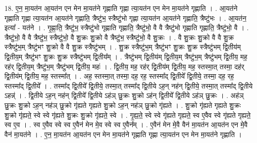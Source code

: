 \documentclass[17pt]{extarticle}
\begin{document}
18. ए॒न॒ मा॒यत॑न आ॒यत॑न एन मेन मा॒यत॑ने गृह्णाति गृह्णा त्या॒यत॑न एन मेन मा॒यत॑ने गृह्णाति । . आ॒यत॑ने गृह्णाति गृह्णा त्या॒यत॑न आ॒यत॑ने गृह्णाति॒ त्रैष्टु॑भ॒ स्त्रैष्टु॑भो गृह्णा त्या॒यत॑न आ॒यत॑ने गृह्णाति॒ त्रैष्टु॑भः । . आ॒यत॑न॒ इत्या᳚ - यत॑ने । . गृ॒ह्णा॒ति॒ त्रैष्टु॑भ॒ स्त्रैष्टु॑भो गृह्णाति गृह्णाति॒ त्रैष्टु॑भो॒ वै वै त्रैष्टु॑भो गृह्णाति गृह्णाति॒ त्रैष्टु॑भो॒ वै । . त्रैष्टु॑भो॒ वै वै त्रैष्टु॑भ॒ स्त्रैष्टु॑भो॒ वै शु॒क्रः शु॒क्रो वै त्रैष्टु॑भ॒ स्त्रैष्टु॑भो॒ वै शु॒क्रः । . वै शु॒क्रः शु॒क्रो वै वै शु॒क्र स्त्रैष्टु॑भ॒म् त्रैष्टु॑भꣳ शु॒क्रो वै वै शु॒क्र स्त्रैष्टु॑भम् । . शु॒क्र स्त्रैष्टु॑भ॒म् त्रैष्टु॑भꣳ शु॒क्रः शु॒क्र स्त्रैष्टु॑भम् द्वि॒तीय॑म् द्वि॒तीय॒म् त्रैष्टु॑भꣳ शु॒क्रः शु॒क्र स्त्रैष्टु॑भम् द्वि॒तीय᳚म् । . त्रैष्टु॑भम् द्वि॒तीय॑म् द्वि॒तीय॒म् त्रैष्टु॑भ॒म् त्रैष्टु॑भम् द्वि॒तीय॒ मह॒ रह॑र् द्वि॒तीय॒म् त्रैष्टु॑भ॒म् त्रैष्टु॑भम् द्वि॒तीय॒ महः॑ । . द्वि॒तीय॒ मह॒ रह॑र् द्वि॒तीय॑म् द्वि॒तीय॒ मह॒ स्तस्मा॒त् तस्मा॒ दह॑र् द्वि॒तीय॑म् द्वि॒तीय॒ मह॒ स्तस्मा᳚त् । . अह॒ स्तस्मा॒त् तस्मा॒ दह॒ रह॒ स्तस्मा᳚द् द्वि॒तीये᳚ द्वि॒तीये॒ तस्मा॒ दह॒ रह॒ स्तस्मा᳚द् द्वि॒तीये᳚ । . तस्मा᳚द् द्वि॒तीये᳚ द्वि॒तीये॒ तस्मा॒त् तस्मा᳚द् द्वि॒तीये ऽह॒न् नह॑न् द्वि॒तीये॒ तस्मा॒त् तस्मा᳚द् द्वि॒तीये ऽहन्न्॑ । . द्वि॒तीये ऽह॒न् नह॑न् द्वि॒तीये᳚ द्वि॒तीये ऽह॑ञ् छु॒क्रः शु॒क्रो ऽह॑न् द्वि॒तीये᳚ द्वि॒तीये ऽह॑ञ् छु॒क्रः । . अह॑ञ् छु॒क्रः शु॒क्रो ऽह॒न् नह॑ञ् छु॒क्रो गृ॑ह्यते गृह्यते शु॒क्रो ऽह॒न् नह॑ञ् छु॒क्रो गृ॑ह्यते । . शु॒क्रो गृ॑ह्यते गृह्यते शु॒क्रः शु॒क्रो गृ॑ह्यते॒ स्वे स्वे गृ॑ह्यते शु॒क्रः शु॒क्रो गृ॑ह्यते॒ स्वे । . गृ॒ह्य॒ते॒ स्वे स्वे गृ॑ह्यते गृह्यते॒ स्व ए॒वैव स्वे गृ॑ह्यते गृह्यते॒ स्व ए॒व । . स्व ए॒वैव स्वे स्व ए॒वैन॑ मेन मे॒व स्वे स्व ए॒वैन᳚म् । . ए॒वैन॑ मेन मे॒वै वैन॑ मा॒यत॑न आ॒यत॑न एन मे॒वै वैन॑ मा॒यत॑ने । . ए॒न॒ मा॒यत॑न आ॒यत॑न एन मेन मा॒यत॑ने गृह्णाति गृह्णा त्या॒यत॑न एन मेन मा॒यत॑ने गृह्णाति । \newline
\end{document}
